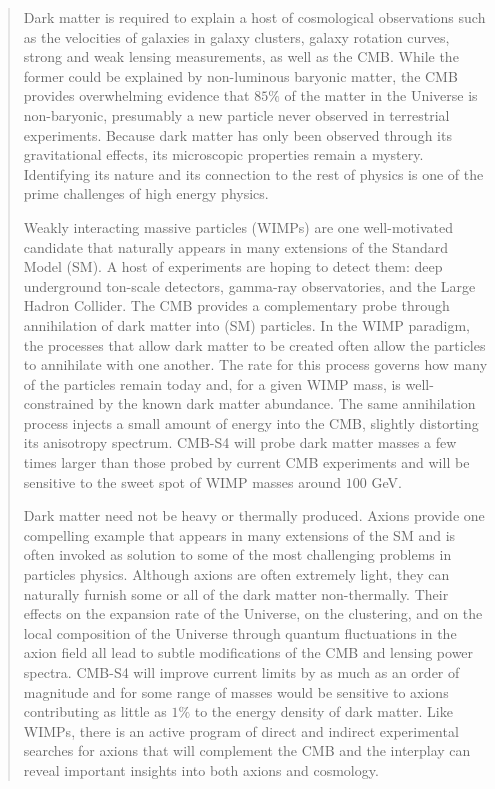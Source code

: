 \begin{quotation}

Dark matter is required to explain a host of cosmological observations such as the velocities of galaxies in galaxy clusters, galaxy rotation curves, strong and weak lensing measurements, as well as the CMB. While the former could be explained by non-luminous baryonic matter, the CMB provides overwhelming evidence that $85\%$ of the matter in the Universe is non-baryonic, presumably a new particle never observed in terrestrial experiments. Because dark matter has only been observed through its gravitational effects, its microscopic properties remain a mystery. Identifying its nature and its connection to the rest of physics is one of the prime challenges of high energy physics.

Weakly interacting massive particles (WIMPs) are one well-motivated candidate that naturally appears in many extensions of the Standard Model (SM). A host of experiments are hoping to detect them: deep underground ton-scale detectors, gamma-ray observatories, and the Large Hadron Collider. The CMB provides a complementary probe through annihilation of dark matter into (SM) particles.   In the WIMP paradigm, the processes that allow dark matter to be created often allow the particles to annihilate with one another. The rate for this process governs how many of the particles remain today and, for a given WIMP mass, is well-constrained by the known dark matter abundance. The same annihilation process injects a small amount of energy into the CMB, slightly distorting its anisotropy spectrum. CMB-S4 will probe dark matter masses a few times larger than those probed by current CMB experiments and will be sensitive to the sweet spot of WIMP masses around $100$ GeV.            

Dark matter need not be heavy or thermally produced. Axions provide one compelling example that appears in many extensions of the SM and is often invoked as solution to some of the most challenging problems in particles physics. Although axions are often extremely light, they can naturally furnish some or all of the dark matter non-thermally. Their effects on the expansion rate of the Universe, on the clustering, and on the local composition of the Universe through quantum fluctuations in the axion field all lead to subtle modifications of the CMB and lensing power spectra. CMB-S4 will improve current limits by as much as an order of magnitude and for some range of masses would be sensitive to axions contributing as little as $1\%$ to the energy density of dark matter.  Like WIMPs, there is an active program of direct and indirect experimental searches for axions that will complement the CMB and the interplay can reveal important insights into both axions and cosmology.  


\end{quotation}
